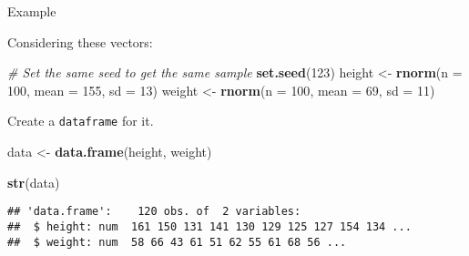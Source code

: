 \documentclass[
  ignorenonframetext,
]{beamer}
\newenvironment{Shaded}{\begin{snugshade}}{\end{snugshade}}
\newcommand{\CommentTok}[1]{\textcolor[rgb]{0.56,0.35,0.01}{\textit{#1}}}
\newcommand{\DataTypeTok}[1]{\textcolor[rgb]{0.13,0.29,0.53}{#1}}
\newcommand{\DecValTok}[1]{\textcolor[rgb]{0.00,0.00,0.81}{#1}}
\newcommand{\KeywordTok}[1]{\textcolor[rgb]{0.13,0.29,0.53}{\textbf{#1}}}
\newcommand{\NormalTok}[1]{#1}
\newcommand{\StringTok}[1]{\textcolor[rgb]{0.31,0.60,0.02}{#1}}
\begin{document}
\begin{frame}[fragile]{Example}
\protect\hypertarget{example-9}{}

Considering these vectors:



\begin{Shaded}
\begin{Highlighting}[]
\CommentTok{# Set the same seed to get the same sample}
\KeywordTok{set.seed}\NormalTok{(}\DecValTok{123}\NormalTok{)}
\NormalTok{height <-}\StringTok{ }\KeywordTok{rnorm}\NormalTok{(}\DataTypeTok{n =} \DecValTok{100}\NormalTok{, }\DataTypeTok{mean =} \DecValTok{155}\NormalTok{, }\DataTypeTok{sd =} \DecValTok{13}\NormalTok{)}
\NormalTok{weight <-}\StringTok{ }\KeywordTok{rnorm}\NormalTok{(}\DataTypeTok{n =} \DecValTok{100}\NormalTok{, }\DataTypeTok{mean =} \DecValTok{69}\NormalTok{, }\DataTypeTok{sd =} \DecValTok{11}\NormalTok{)}
\end{Highlighting}
	\end{Shaded}
	
Create a \texttt{dataframe} for it.

\begin{Shaded}
\begin{Highlighting}[]
\NormalTok{data <-}\StringTok{ }\KeywordTok{data.frame}\NormalTok{(height, weight)}
\end{Highlighting}
\end{Shaded}

\begin{Shaded}
\begin{Highlighting}[]
\KeywordTok{str}\NormalTok{(data)}
\end{Highlighting}
\end{Shaded}

\begin{verbatim}
## 'data.frame':    120 obs. of  2 variables:
##  $ height: num  161 150 131 141 130 129 125 127 154 134 ...
##  $ weight: num  58 66 43 61 51 62 55 61 68 56 ...
\end{verbatim}

\end{frame}
\end{document}
